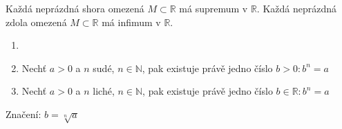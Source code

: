 \begin{property}
	Každá neprázdná shora omezená $M\subset\mathbb{R}$ má supremum v $\mathbb{R}$.
	Každá neprázdná zdola omezená $M\subset\mathbb{R}$ má infimum v $\mathbb{R}$.
\end{property}

\begin{definition}
	\begin{enumerate}
		\item[]
		\item Nechť $a>0$ a $n$ sudé, $n\in\mathbb{N}$, pak existuje právě jedno číslo $b>0: b^n=a$
		\item Nechť $a>0$ a $n$ liché, $n\in\mathbb{N}$, pak existuje právě jedno číslo $b\in\mathbb{R}: b^n=a$
	\end{enumerate}
	Značení: $b=\sqrt[n]{a}$
\end{definition}



